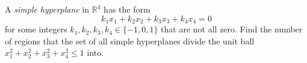 A \emph{simple hyperplane} in $\mathbb{R}^4$ has the form \[k_1x_1+k_2x_2+k_3x_3+k_4x_4=0\] for some integers $k_1,k_2,k_3,k_4\in \{-1,0,1\}$ that are not all zero. Find the number of regions that the set of all simple hyperplanes divide the unit ball $x_1^2+x_2^2+x_3^2+x_4^2\leq 1$ into.

